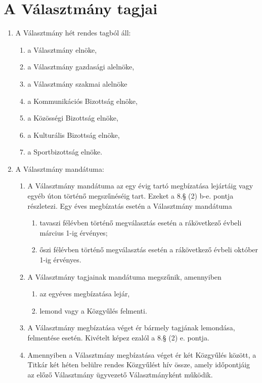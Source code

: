 \documentclass{../styles/rulebook}
\begin{document}
\section{A Választmány tagjai}

\begin{enumerate}
	\item A Választmány hét rendes tagból áll:
	\begin{enumerate}
		\item a Választmány elnöke,
		\item a Választmány gazdasági alelnöke,
		\item a Választmány szakmai alelnöke
        \item a Kommunikációs Bizottság elnöke,
        \item a Közösségi Bizottság elnöke,
        \item a Kulturális Bizottság elnöke,
        \item a Sportbizottság elnöke.
	\end{enumerate}
	\item A Választmány mandátuma:
	\begin{enumerate}
		\item A Választmány mandátuma az egy évig tartó megbízatása lejártáig vagy egyéb úton történő megszűnéséig tart. Ezeket a 8.§ (2) b-e. pontja részletezi. Egy éves megbízatás esetén a Választmány mandátuma
		\begin{enumerate}
			\item tavaszi félévben történő megválasztás esetén a rákövetkező évbeli március 1-ig érvényes;
			\item őszi félévben történő megválasztás esetén a rákövetkező évbeli október 1-ig érvényes.
		\end{enumerate}
		\item A Választmány tagjainak mandátuma megszűnik, amennyiben
		\begin{enumerate}
			\item az egyéves megbízatása lejár,
			\item lemond vagy a Közgyűlés felmenti.
		\end{enumerate}
		\item A Választmány megbízatása véget ér bármely tagjának lemondása, felmentése esetén. Kivételt képez ezalól a 8.§ (2) e. pontja.
		\item Amennyiben a Választmány megbízatása véget ér két Közgyűlés között, a Titkár két héten belülre rendes Közgyűlést hív össze, amely időpontjáig az előző Választmány ügyvezető Választmányként működik.

\end{enumerate}
\end{enumerate}
\end{document}
